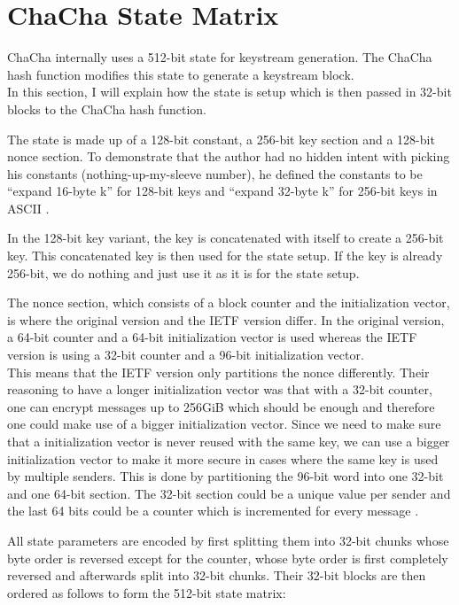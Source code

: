 \section{ChaCha State Matrix}
\label{sec:chacha.matrix}

ChaCha internally uses a 512-bit state for keystream generation. The ChaCha hash function modifies this state to generate a keystream block. \\
In this section, I will explain how the state is setup which is then passed in 32-bit blocks to the ChaCha hash function.

The state is made up of a 128-bit constant, a 256-bit key section and a 128-bit nonce section. To demonstrate that the author had no hidden intent with picking his constants (nothing-up-my-sleeve number), he defined the constants to be ``expand 16-byte k'' for 128-bit keys and ``expand 32-byte k'' for 256-bit keys in ASCII .

In the 128-bit key variant, the key is concatenated with itself to create a 256-bit key. This concatenated key is then used for the state setup. If the key is already 256-bit, we do nothing and just use it as it is for the state setup.

The nonce section, which consists of a block counter and the initialization vector, is where the original version and the IETF version differ. In the original version, a 64-bit counter and a 64-bit initialization vector is used whereas the IETF version is using a 32-bit counter and a 96-bit initialization vector. \\
This means that the IETF version only partitions the nonce differently. Their reasoning to have a longer initialization vector was that with a 32-bit counter, one can encrypt messages up to 256GiB which should be enough and therefore one could make use of a bigger initialization vector. Since we need to make sure that a initialization vector is never reused with the same key, we can use a bigger initialization vector to make it more secure in cases where the same key is used by multiple senders. This is done by partitioning the 96-bit word into one 32-bit and one 64-bit section. The 32-bit section could be a unique value per sender and the last 64 bits could be a counter which is incremented for every message \cite{rfc8439}.

All state parameters are encoded by first splitting them into 32-bit chunks whose byte order is reversed except for the counter, whose byte order is first completely reversed and afterwards split into 32-bit chunks. Their 32-bit blocks are then ordered as follows to form the 512-bit state matrix:

